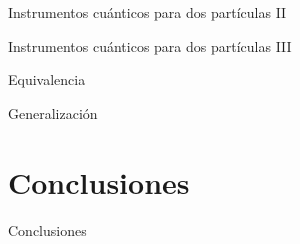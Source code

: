 \documentclass[svgnames,12pt,aspectratio=149]{beamer}
\begin{document}
\begin{frame}{Instrumentos cuánticos para dos partículas II}
\begin{figure}[H]
\centering
{}
\caption*{} 
\end{figure} 

\end{frame}

\begin{frame}{Instrumentos cuánticos para dos partículas III}
\begin{figure}[H]
    \centering
{}
\caption*{} 
\end{figure} 
\end{frame}

\begin{frame}{Equivalencia}
    
\end{frame}


\begin{frame}{Generalización}
    
\end{frame}

\section{Conclusiones}

\begin{frame}{Conclusiones}
    
\end{frame}
\end{document}
